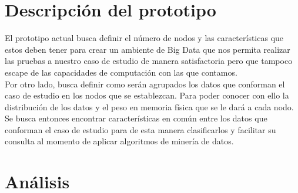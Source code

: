 \section{Descripción del prototipo} 
El prototipo actual busca definir el número de nodos y las características que estos deben tener para crear un ambiente de Big Data que nos permita realizar las pruebas a nuestro caso de estudio de manera satisfactoria pero que tampoco escape de las capacidades de computación con las que contamos.
\\
Por otro lado, busca definir como serán agrupados los datos que conforman el caso de estudio en los nodos que se establezcan. Para poder conocer con ello la distribución de los datos y el peso en memoria física que se le dará a cada nodo.
\\
Se busca entonces encontrar características en común entre los datos que conforman el caso de estudio para de esta manera clasificarlos y facilitar su consulta al momento de aplicar algoritmos de minería de datos. 
\section{Análisis}
